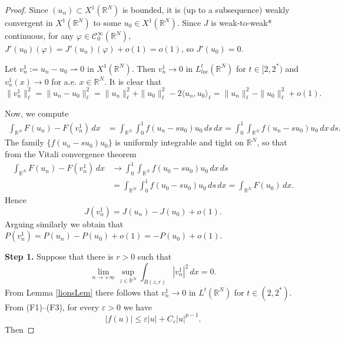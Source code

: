 \documentclass[12pt,leqno,twoside,sort]{amsart}
\newcommand{\R}{\mathbb{R}}
\newcommand{\cC}{{\mathcal C}}
\newcommand{\weakto}{\rightharpoonup}
\numberwithin{equation}{section}
\begin{document}
\begin{proof}


Since $(u_n) \subset X^1 (\R^N)$ is bounded, it is (up to a subsequence) weakly convergent in $X^1 (\R^N)$ to some $u_0 \in X^1 (\R^N)$. Since $J$ is weak-to-weak* continuous, for any $\varphi \in \cC_0^\infty (\R^N)$, $J'(u_0)(\varphi) = J'(u_n)(\varphi) + o(1) = o(1)$, so $J'(u_0) = 0$.



Let $v_n^1 := u_n - u_0 \weakto 0$ in $X^1 (\R^N)$. Then $v_n^1 \to 0$ in $L^t_{loc} (\R^N)$ for $t \in [2,2^*)$ and $v_n^1 (x) \to 0$ for a.e. $x \in \R^N$. It is clear that
\begin{equation}\label{E:v_n^1-norm}
    \|v_n^1\|^2_\ell = \| u_n - u_0\|^2_\ell = \|u_n\|^2_\ell + \|u_0\|^2_\ell - 2 \langle u_n, u_0 \rangle_\ell = \|u_n\|^2_\ell - \|u_0\|^2_\ell + o (1).
\end{equation}

Now, we compute
\begin{align*}
\int_{\R^N} F(u_n) - F(v_n^1) \, dx  &= \int_{\R^N} \int_0^1 f(u_n - s u_0)u_0 \, ds \, dx = \int_0^1 \int_{\R^N} f(u_n - s u_0)u_0 \, dx \, ds.
\end{align*}
The family $\{ f(u_n - s u_0)u_0 \}$ is uniformly integrable and tight on $\R^N$, so that from the Vitali convergence theorem
\begin{equation}\label{E:F_convergence}
\begin{split}
\int_{\R^N} F(u_n) - F(v_n^1) \, dx &\to
 \int_0^1 \int_{\R^N} f(u_0 - s u_0)u_0 \, dx \, ds \\
&=   \int_{\R^N} \int_0^1 f(u_0 - s u_0)u_0  \, ds \, dx = \int_{\R^N} F(u_0) \, dx.
\end{split}
\end{equation}
Hence
$$
J(v_n^1) = J(u_n) - J(u_0) + o(1).
$$
Arguing similarly we obtain that $P(v_n^1) = P(u_n)-P(u_0)+o(1)=-P(u_0)+o(1)$.

\textbf{Step 1.}
Suppose that there is $r > 0$ such that
\begin{equation}\label{lionsCond}
\lim_{n \to +\infty} \sup_{z \in \R^N} \int_{B(z, r)} |v_n^1|^2 \, dx = 0.
\end{equation}
From Lemma \ref{lionsLem} there follows that $v_n^1 \to 0$ in $L^t (\R^N)$ for $t \in (2,2^*)$.
From (F1)--(F3), for every $\varepsilon > 0$ we have
$$
|f(u)| \leq \varepsilon |u| + C_\varepsilon |u|^{p-1}.
$$
Then


\end{proof}
\end{document}
